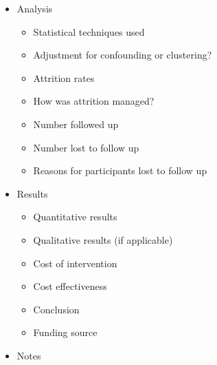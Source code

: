 \begin{itemize}
\begin{itemize}
\end{itemize}

\item Analysis

\begin{itemize}
\item Statistical techniques used

\item Adjustment for confounding or clustering?

\item Attrition rates

\item How was attrition managed?

\item Number followed up

\item Number lost to follow up

\item Reasons for participants lost to follow up

\end{itemize}

\item Results

\begin{itemize}
\item Quantitative results

\item Qualitative results (if applicable)

\item Cost of intervention

\item Cost effectiveness

\item Conclusion

\item Funding source

\end{itemize}

\item Notes

\end{itemize}

